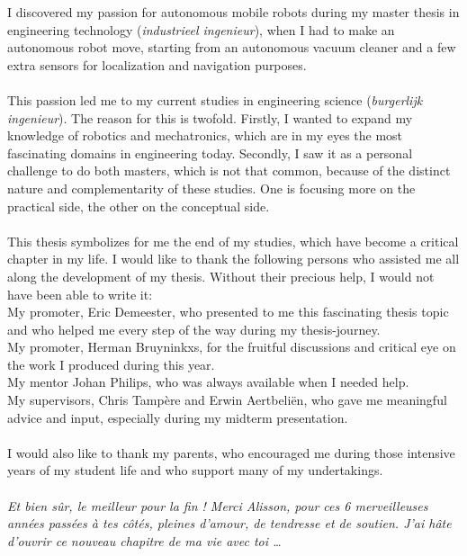\documentclass[twoside,english,master=wtk,inputenc="utf8"]{kulemt}
\begin{document}
\begin{preface}
I discovered my passion for autonomous mobile robots during my master thesis in engineering technology (\emph{industrieel ingenieur}), when I had to make an autonomous robot move, starting from an autonomous vacuum cleaner and a few extra sensors for localization and navigation purposes. 
 \\ \\
This passion led me to my current studies in engineering science (\emph{burgerlijk ingenieur}). 
The reason for this is twofold. Firstly, I wanted to expand my knowledge of robotics and mechatronics, which are in my eyes the most fascinating domains in engineering today. 
Secondly, I saw it as a personal challenge to do both masters, which is not that common, because of the distinct nature and complementarity of these studies. One is focusing more on the practical side, the other on the conceptual side.
 \\ \\
This thesis symbolizes for me the end of my studies, which have become a critical chapter in my life. I would like to thank the following persons who assisted me all along the development of my thesis.  Without their precious help, I would not have been able to write it:
\\
My promoter, Eric Demeester, who presented to me this fascinating thesis topic and who helped me every step of the way during my thesis-journey.
\\
My promoter, Herman Bruyninkxs, for the fruitful discussions and critical eye on the work I produced during this year.
\\
My mentor Johan Philips, who was always available when I needed help.
\\
My supervisors, Chris Tampère and Erwin Aertbeliën, who gave me meaningful advice and input, especially during my midterm presentation.
 \\ \\
I would also like to thank my parents, who encouraged me during those intensive years of my student life and who support many of my undertakings.
 \\ \\
\emph{Et bien sûr, le meilleur pour la fin ! Merci Alisson, pour ces 6 merveilleuses années passées à tes côtés, pleines d'amour, de tendresse et de soutien. J'ai hâte d'ouvrir ce nouveau chapitre de ma vie avec toi \dots}
\end{preface}
\end{document}
